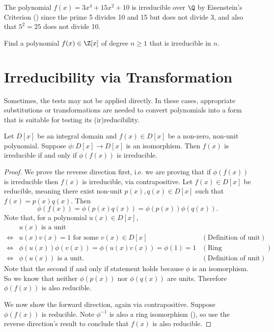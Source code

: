 \begin{example}
    The polynomial $f(x) = 3x^4 + 15x^2 + 10$ is irreducible over $\Q$ by Eisenstein's Criterion () since the prime 5 divides 10 and 15 but does not divide 3, and also that $5^2 = 25$ does not divide 10.
\end{example}

\begin{exercise}
    Find a polynomial $f(x) \in \Z[x]$ of degree $n \geq 1$ that is irreducible in $n$.
\end{exercise}

\section{Irreducibility via Transformation}
Sometimes, the tests may not be applied directly. In these cases, appropriate substitutions or transformations are needed to convert polynomials into a form that is suitable for testing its (ir)reducibility.

\begin{theorem}\label{thrm-transformation-rule-for-irreducibility}
    Let $D[x]$ be an integral domain and $f(x) \in D[x]$ be a non-zero, non-unit polynomial. Suppose $\phi: D[x] \to D[x]$ is an isomorphism. Then $f(x)$ is irreducible if and only if $\phi(f(x))$ is irreducible.
\end{theorem}
\begin{proof}
    We prove the reverse direction first, i.e. we are proving that if $\phi(f(x))$ is irreducible then $f(x)$ is irreducible, via contrapositive. Let $f(x) \in D[x]$ be reducible, meaning there exist non-unit $p(x), q(x) \in D[x]$ such that $f(x) = p(x)q(x)$. Then
    \[
        \phi(f(x)) = \phi(p(x)q(x)) = \phi(p(x))\phi(q(x)).
    \]
    Note that, for a polynomial $u(x) \in D[x]$,
    \begin{align*}
        &u(x) \text{ is a unit}\\
        \iff&u(x)v(x) = 1 \text{ for some }v(x) \in D[x] & (\text{Definition of unit})\\
        \iff&\phi(u(x))\phi(v(x))  = \phi(u(x)v(x)) = \phi(1) = 1 & (\text{Ring homomorphism properties})\\
        \iff&\phi(u(x)) \text{ is a unit.} & (\text{Definition of unit})
    \end{align*}
    Note that the second if and only if statement holds because $\phi$ is an isomorphism. So we know that neither $\phi(p(x))$ nor $\phi(q(x))$ are units. Therefore $\phi(f(x))$ is also reducible.

    We now show the forward direction, again via contrapositive. Suppose $\phi(f(x))$ is reducible. Note $\phi^{-1}$ is also a ring isomorphism (), so use the reverse direction's result to conclude that $f(x)$ is also reducible.
\end{proof}

